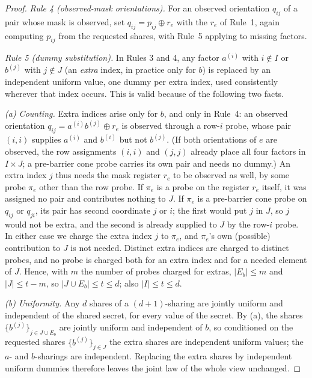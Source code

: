 \documentclass[lettersize,journal]{IEEEtran}
\newcommand{\share}[2]{#1^{(#2)}}
\begin{document}
\begin{proof}
\emph{Rule 4 (observed-mask orientations).} For an observed orientation
$q_{ij}$ of a pair whose mask is observed, set $q_{ij}=p_{ij}\oplus r_e$
with the $r_e$ of Rule~1, again computing $p_{ij}$ from the requested
shares, with Rule~5 applying to missing factors.

\emph{Rule 5 (dummy substitution).} In Rules 3 and 4, any factor
$\share{a}{i}$ with $i\notin I$ or $\share{b}{j}$ with $j\notin J$ (an
\emph{extra} index, in practice only for $b$) is replaced by an independent uniform value, one dummy
per extra index, used consistently wherever that index occurs. This is
valid because of the following two facts.

\emph{(a) Counting.} Extra indices arise only for $b$, and only in
Rule~4: an observed orientation $q_{ij}=\share{a}{i}\share{b}{j}\oplus r_e$
is observed through a row-$i$ probe, whose pair $(i,i)$ supplies
$\share{a}{i}$ and $\share{b}{i}$ but not $\share{b}{j}$. (If both
orientations of $e$ are observed, the row assignments $(i,i)$ and $(j,j)$
already place all four factors in $I\times J$; a pre-barrier cone probe
carries its own pair and needs no dummy.) An extra index $j$ thus needs the
mask register $r_e$ to be observed as well, by some probe $\pi_e$ other than
the row probe. If $\pi_e$ is a probe on the register $r_e$ itself, it was
assigned no pair and contributes nothing to $J$. If $\pi_e$ is a
pre-barrier cone probe on $q_{ij}$ or $q_{ji}$, its pair has second
coordinate $j$ or $i$; the first would put $j$ in $J$, so $j$ would not be
extra, and the second is already supplied to $J$ by the row-$i$ probe. In
either case we charge the extra index $j$ to $\pi_e$, and $\pi_e$'s own
(possible) contribution to $J$ is not needed. Distinct extra indices are
charged to distinct probes, and no probe is charged both for an extra index
and for a needed element of $J$. Hence, with $m$ the number of probes charged
for extras, $|E_b|\le m$ and $|J|\le t-m$, so $|J\cup E_b|\le t\le d$; also
$|I|\le t\le d$.

\emph{(b) Uniformity.} Any $d$ shares of a $(d{+}1)$-sharing are jointly
uniform and independent of the shared secret, for every value of the secret.
By (a), the shares $\{\share{b}{j}\}_{j\in J\cup E_b}$ are jointly uniform
and independent of $b$, so conditioned on the requested shares
$\{\share{b}{j}\}_{j\in J}$ the extra shares are independent uniform
values; the $a$- and $b$-sharings are
independent. Replacing the extra shares by independent uniform dummies
therefore leaves the joint law of the whole view unchanged.


\end{proof}
\end{document}
